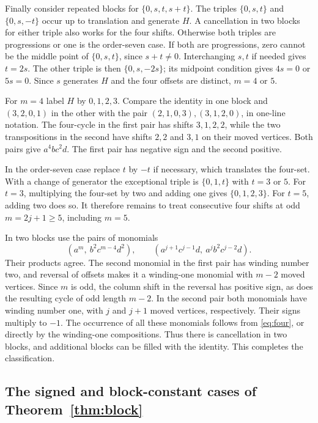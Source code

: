 \documentclass[11pt,reqno]{amsart}
\theoremstyle{remark}
\numberwithin{equation}{section}
\begin{document}
Finally consider repeated blocks for \(\{0,s,t,s+t\}\). The triples
\(\{0,s,t\}\) and \(\{0,s,-t\}\) occur up to translation and generate
\(H\). A cancellation in two blocks for either triple also works for the
four shifts. Otherwise both triples are progressions or one is the
order-seven case. If both are progressions, zero cannot be the middle
point of \(\{0,s,t\}\), since \(s+t\ne0\). Interchanging \(s,t\) if
needed gives \(t=2s\). The other triple is then \(\{0,s,-2s\}\); its
midpoint condition gives \(4s=0\) or \(5s=0\). Since \(s\) generates
\(H\) and the four offsets are distinct, \(m=4\) or \(5\).

For \(m=4\) label \(H\) by \(0,1,2,3\). Compare the identity in one block
and \((3,2,0,1)\) in the other with the pair \((2,1,0,3),(3,1,2,0)\), in
one-line notation. The four-cycle in the first pair has shifts
\(3,1,2,2\), while the two transpositions in the second have shifts
\(2,2\) and \(3,1\) on their moved vertices. Both pairs give
\(a^4bc^2d\). The first pair has negative sign and the second positive.

In the order-seven case replace \(t\) by \(-t\) if necessary, which
translates the four-set. With a change of generator the exceptional
triple is \(\{0,1,t\}\) with \(t=3\) or \(5\). For \(t=3\), multiplying
the four-set by two and adding one gives \(\{0,1,2,3\}\). For \(t=5\),
adding two does so. It therefore remains to treat consecutive four shifts
at odd \(m=2j+1\ge5\), including \(m=5\).

In two blocks use the pairs of monomials
\[
 (a^m,\ b^2 c^{m-4}d^2),\qquad
 (a^{j+1}c^{j-1}d,\ a^j b^2 c^{j-2}d).
\]
Their products agree. The second monomial in the first pair has winding
number two, and reversal of offsets makes it a winding-one monomial with
\(m-2\) moved vertices. Since \(m\) is odd, the column shift in the
reversal has positive sign, as does the resulting cycle of odd length
\(m-2\). In the second pair both monomials have winding number one, with
\(j\) and \(j+1\) moved vertices, respectively. Their signs multiply to
\(-1\). The occurrence of all these monomials follows from
\eqref{eq:four}, or directly by the winding-one compositions. Thus there
is cancellation in two blocks, and additional blocks can be filled with
the identity. This completes the classification.

\subsection{The signed and block-constant cases of Theorem~\ref{thm:block}}
\end{document}
